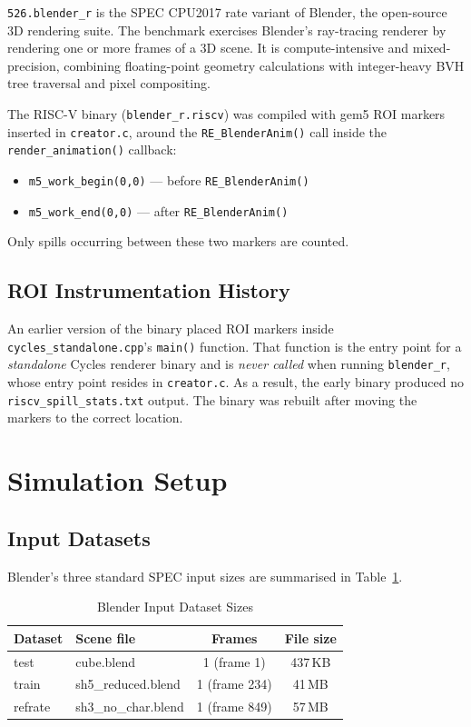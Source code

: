\documentclass[conference]{IEEEtran}
\begin{document}
\texttt{526.blender\_r} is the SPEC CPU2017 rate variant of Blender,
the open-source 3D rendering suite. The benchmark exercises Blender's
ray-tracing renderer by rendering one or more frames of a 3D scene.
It is compute-intensive and mixed-precision, combining floating-point
geometry calculations with integer-heavy BVH tree traversal and
pixel compositing.

The RISC-V binary (\texttt{blender\_r.riscv}) was compiled with gem5 ROI
markers inserted in \texttt{creator.c}, around the \texttt{RE\_BlenderAnim()}
call inside the \texttt{render\_animation()} callback:

\begin{itemize}
    \item \texttt{m5\_work\_begin(0,0)} --- before \texttt{RE\_BlenderAnim()}
    \item \texttt{m5\_work\_end(0,0)}   --- after  \texttt{RE\_BlenderAnim()}
\end{itemize}

Only spills occurring between these two markers are counted.

\subsection{ROI Instrumentation History}

An earlier version of the binary placed ROI markers inside
\texttt{cycles\_standalone.cpp}'s \texttt{main()} function. That
function is the entry point for a \emph{standalone} Cycles renderer
binary and is \emph{never called} when running \texttt{blender\_r},
whose entry point resides in \texttt{creator.c}. As a result, the
early binary produced no \texttt{riscv\_spill\_stats.txt} output.
The binary was rebuilt after moving the markers to the correct location.

\section{Simulation Setup}

\subsection{Input Datasets}

Blender's three standard SPEC input sizes are summarised in
Table~\ref{tab:inputs}.

\begin{table}[H]
\centering
\caption{Blender Input Dataset Sizes}
\label{tab:inputs}
\begin{tabular}{llcc}
\toprule
\textbf{Dataset} & \textbf{Scene file} & \textbf{Frames} & \textbf{File size} \\
\midrule
test    & cube.blend          & 1 (frame 1)   & 437\,KB \\
train   & sh5\_reduced.blend  & 1 (frame 234) & 41\,MB  \\
refrate & sh3\_no\_char.blend & 1 (frame 849) & 57\,MB  \\
\bottomrule
\end{tabular}
\end{table}
\end{document}
